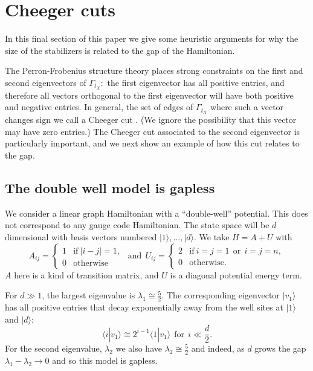 \documentclass[11pt,oneside]{article}
\def\Ham{H}
\newcommand{\ket}[1]{|{#1}\rangle}
\newcommand{\braket}[2]{\langle{#1}|{#2}\rangle}
\begin{document}
\section{Cheeger cuts}\label{Sec7}

In this final section of this paper 
we give some heuristic
arguments for why the size of the stabilizers is
related to the gap of the Hamiltonian. 

The Perron-Frobenius structure theory places
strong constraints on the first and second
eigenvectors of $\Gamma_{t_X}:$
the first eigenvector has all positive entries,
and therefore all vectors orthogonal to the first
eigenvector will have both positive and negative entries.
In general, the set of edges of $\Gamma_{t_X}$ where
such a vector changes sign we call a Cheeger cut 
\cite{Cheeger1970,Chung1997}.
(We ignore the possibility that this vector
may have zero entries.)
The Cheeger cut associated to the second eigenvector
is particularly important, and we next show an
example of how this cut relates to the gap.

\subsection{The double well model is gapless}\label{Sec71}

We consider a linear graph Hamiltonian
with a ``double-well'' potential.
This does not correspond to any gauge code Hamiltonian.
The state space will be $d$ dimensional with
basis vectors numbered $\ket{1},...,\ket{d}.$
We take
$ \Ham = A + U $
with
$$
A_{ij} = \left\{ \begin{array}{ll}
     1 &\mbox{if}\  |i-j|=1,  \\
     0 &\mbox{otherwise}\end{array}\right.
\ \ \mbox{and}\ \ 
U_{ij} =  \left\{ \begin{array}{ll}
     2 &\mbox{if}\  i=j=1 \ \ \mbox{or}\ \  i=j=n, \\
     0 &\mbox{otherwise.}\end{array}\right.
$$
$A$ here is a kind of transition matrix,
and $U$ is a diagonal potential energy term.

For $d\gg 1$, the largest
eigenvalue is $\lambda_1 \cong \frac{5}{2}$.
The corresponding eigenvector $\ket{v_1}$
has all positive entries that
decay exponentially away from the well sites
at $\ket{1}$ and $\ket{d}:$
$$
    \braket{i}{v_1} 
    \cong 2^{i-1} \braket{1}{v_1}
    \ \ \mbox{for}\ \ i\ll \frac{d}{2}.
$$
For the second eigenvalue, $\lambda_2$
we also have  $\lambda_2 \cong \frac{5}{2}$
and indeed, as $d$ grows
the gap $\lambda_1 - \lambda_2 \rightarrow 0$
and so this model is gapless.
\end{document}
